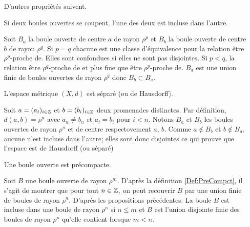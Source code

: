 D'autres propriétés suivent.
\begin{prop}
 Si deux boules ouvertes se coupent, l'une des deux est incluse dans l'autre.
\end{prop}
\begin{demo}
Soit $B_a$ la boule ouverte de centre $a$ de rayon $\rho^p$ et $B_b$ la boule ouverte de centre $b$ de rayon $\rho^q$.\newline
Si $p=q$ chacune est une classe d'équivalence pour la relation \og être $\rho^p$-proche de\fg{}. Elles sont confondues si elles ne sont pas disjointes.\newline
Si $p < q$, la relation \og être $\rho^q$-proche de\fg{} et plus fine que \og être $\rho^p$-proche de\fg{}. $B_a$ est une union finie de boules ouvertes de rayon $\rho^q$ donc $B_b \subset B_a$.
\end{demo}

 
\begin{propn}\label{Prop:PromHausdorff}
 L'espace métrique $(X,d)$ est séparé (ou de Hausdorff).
\end{propn}
\begin{demo}
 Soit $a=(a_i)_{i\in \mathbb{Z}}$ et $b=(b_i)_{i\in \mathbb{Z}}$ deux promenades distinctes. Par définition, $d(a,b)=\rho^n$ avec $a_n \neq b_n$ et $a_i = b_i$ pour $i<n$. Notons $B_a$ et $B_b$ les boules ouvertes de rayon $\rho^n$ et de centre respectovement $a$, $b$. Comme $a\notin B_b$ et $b\notin B_a$, aucune n'est incluse dans l'autre; elles sont donc disjointes ce qui prouve que l'espace est de Hausdorff (ou séparé)
\end{demo}

\begin{propn}\label{Prop:BoulPreCompct}
 Une boule ouverte est précompacte.
\end{propn}
\begin{demo}
 Soit $B$ une boule ouverte de rayon $\rho^m$. D'après la définition \ref{Def:PreCompct}, il s'agit de montrer que pour tout $n\in \mathbb{Z}$, on peut recouvrir $B$ par une union finie de boules de rayon $\rho^n$.\newline
 D'après les propositions précédentes. La boule $B$ est incluse dans une boule de rayon $\rho^n$ si $n \leq m$ et $B$ est l'union disjointe finie des boules de rayon $\rho^n$ qu'elle contient lorsque $m < n$.
\end{demo}

